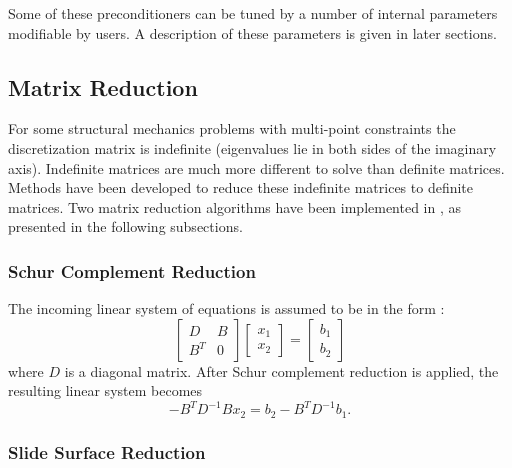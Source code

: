Some of these preconditioners can be tuned by a number of internal parameters
modifiable by users. A description of these parameters is given in later
sections.

\subsection{Matrix Reduction} 

For some structural mechanics problems with multi-point constraints the 
discretization matrix is indefinite (eigenvalues lie in both sides of
the imaginary axis). Indefinite matrices are much more different to solve
than definite matrices. Methods have been developed to reduce these
indefinite matrices to definite matrices.  Two matrix reduction algorithms
have been implemented in \hypre{}, as presented in the following subsections.

\subsubsection{Schur Complement Reduction}

The incoming linear system of equations is assumed to be in the form :
\[ \left[ 
\begin{array}{cc} 
   D   & B \\
   B^T & 0
\end{array}
  \right] 
  \left[
\begin{array}{c} 
   x_1 \\
   x_2
\end{array}
  \right] 
  =
  \left[
\begin{array}{c} 
   b_1 \\
   b_2
\end{array}
  \right] 
\]
where $D$ is a diagonal matrix.  After Schur complement reduction is applied, 
the resulting linear system becomes
$$
- B^T D^{-1} B x_2 = b_2 - B^T D^{-1} b_1.
$$

\subsubsection{Slide Surface Reduction}

